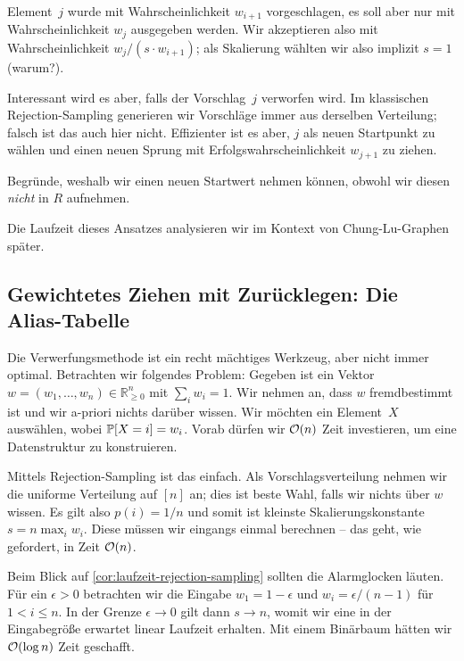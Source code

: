Element~$j$ wurde mit Wahrscheinlichkeit $w_{i+1}$ vorgeschlagen, es soll aber nur mit Wahrscheinlichkeit $w_j$ ausgegeben werden.
Wir akzeptieren also mit Wahrscheinlichkeit $w_{j} / (s \cdot w_{i+1})$; als Skalierung wählten wir also implizit $s=1$ (warum?).

Interessant wird es aber, falls der Vorschlag~$j$ verworfen wird.
Im klassischen Rejection-Sampling generieren wir Vorschläge immer aus derselben Verteilung; falsch ist das auch hier nicht.
Effizienter ist es aber, $j$ als neuen Startpunkt zu wählen und einen neuen Sprung mit Erfolgswahrscheinlichkeit $w_{j+1}$ zu ziehen.

\begin{exercise}
    Begründe, weshalb wir einen neuen Startwert nehmen können, obwohl wir diesen \emph{nicht} in $R$ aufnehmen.
\end{exercise}

Die Laufzeit dieses Ansatzes analysieren wir im Kontext von Chung-Lu-Graphen später.

\subsection{Gewichtetes Ziehen mit Zurücklegen: Die Alias-Tabelle}\label{subsec:alias1}
Die Verwerfungsmethode ist ein recht mächtiges Werkzeug, aber nicht immer optimal.
Betrachten wir folgendes Problem:
Gegeben ist ein Vektor $w = (w_1, \ldots, w_n) \in \mathbb R_{\ge 0}^n$ mit $\sum_i w_i = 1$.
Wir nehmen an, dass $w$ fremdbestimmt ist und wir a-priori nichts darüber wissen.
Wir möchten ein Element~$X$ auswählen, wobei $\mathbb{P}\!\left[X = i\right] = w_i$.
Vorab dürfen wir $\mathcal{O}\!\left(n\right)$ Zeit investieren, um eine Datenstruktur zu konstruieren.

Mittels Rejection-Sampling ist das einfach.
Als Vorschlagsverteilung nehmen wir die uniforme Verteilung auf $[n]$ an; dies ist beste Wahl, falls wir nichts über $w$ wissen.
Es gilt also $p(i) = 1/n$ und somit ist kleinste Skalierungskonstante $s = n \max_i{w_i}$.
Diese müssen wir eingangs einmal berechnen -- das geht, wie gefordert, in Zeit $\mathcal{O}\!\left(n\right)$.

Beim Blick auf \cref{cor:laufzeit-rejection-sampling} sollten die Alarmglocken läuten.
Für ein $\epsilon > 0$ betrachten wir die Eingabe $w_1 = 1 - \epsilon$ und $w_i = \epsilon / (n - 1)$ für $1 < i \le n$.
In der Grenze $\epsilon \to 0$ gilt dann $s \to n$, womit wir eine in der Eingabegröße erwartet linear Laufzeit erhalten.
Mit einem Binärbaum hätten wir $\mathcal{O}\!\left(\log n\right)$ Zeit geschafft.

